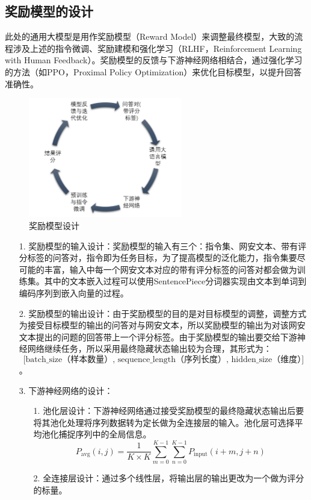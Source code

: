 \subsection{奖励模型的设计}
此处的通用大模型是用作奖励模型（Reward Model）来调整最终模型，大致的流程涉及上述的指令微调、奖励建模和强化学习（RLHF，Reinforcement Learning with Human Feedback）。奖励模型的反馈与下游神经网络相结合，通过强化学习的方法（如PPO\cite{Wang2024APT}，Proximal Policy Optimization）来优化目标模型，以提升回答准确性。
\begin{figure}[htbp]
    \centering
    \includegraphics[width=0.6\textwidth]{./img/rm.png}
    \caption{奖励模型设计}\label{fig:奖励模型设计}
\end{figure}
\begin{itemize}
    \item[1.]奖励模型的输入设计\cite{pmlr-v202-longpre23a}：奖励模型的输入有三个：指令集、网安文本、带有评分标签的问答对，指令即为任务目标，为了提高模型的泛化能力，指令集要尽可能的丰富，输入中每一个网安文本对应的带有评分标签的问答对都会做为训练集。其中的文本嵌入过程可以使用SentencePiece分词器实现由文本到单词到编码序列到嵌入向量的过程。
    \item[2.]奖励模型的输出设计：由于奖励模型的目的是对目标模型的调整，调整方式为接受目标模型的输出的问答对与网安文本，所以奖励模型的输出为对该网安文本提出的问题的回答带上一个评分标签。由于奖励模型的输出要交给下游神经网络继续任务，所以采用最终隐藏状态输出较为合理，其形式为：\[ \text{[batch\_size（样本数量）, sequence\_length（序列长度）,  hidden\_size（维度）]} \]。
    \item[3.] 下游神经网络的设计\cite{Chung2022ScalingIL}：
    \begin{itemize}
        \item[1.]池化层设计：下游神经网络通过接受奖励模型的最终隐藏状态输出后要将其池化处理将序列数据转为定长做为全连接层的输入。池化层可选择平均池化捕捉序列中的全局信息。
        \[P_{\text{avg}}(i, j) = \frac{1}{K \times K} \sum_{m=0}^{K-1} \sum_{n=0}^{K-1} P_{\text{input}}(i + m, j + n)\]
        \item[2.]全连接层设计：通过多个线性层，将输出层的输出更改为一个做为评分的标量。
    \end{itemize}
\end{itemize}
